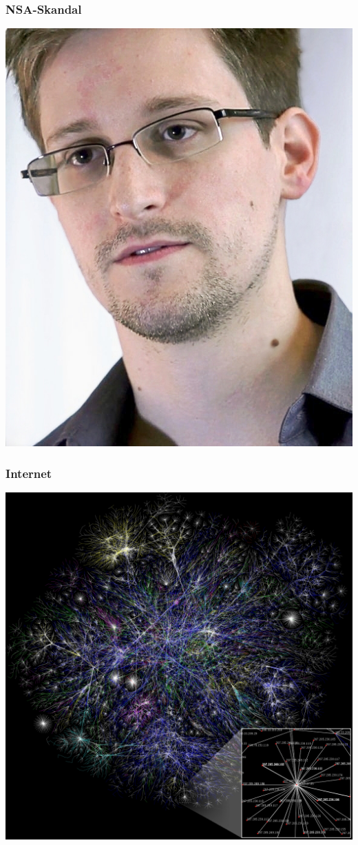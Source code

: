 \documentclass[12pt]{beamer}
\begin{document}
\begin{frame}
    \frametitle{NSA-Skandal}
    \begin{center}
	\includegraphics[height=0.7\textheight]{img/snowden.jpg}
    \end{center}	
\end{frame}

\begin{frame}
  \frametitle{Internet}
  \begin{center}
    \includegraphics[height=0.7\textheight]{img/internet.jpg}
  \end{center}
\end{frame}
\end{document}
